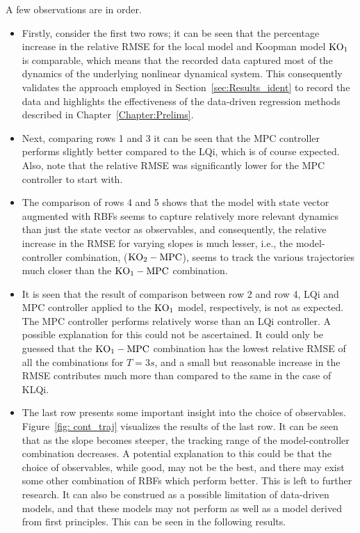 A few observations are in order. 
\begin{itemize}
    \item Firstly, consider the first two rows; it can be seen that the percentage increase in the relative RMSE for the local model and Koopman model $\textup{KO}_1$ is comparable, which means that the recorded data captured most of the dynamics of the underlying nonlinear dynamical system. This consequently validates the approach employed in Section~\ref{sec:Results_ident} to record the data and highlights the effectiveness of the data-driven regression methods described in Chapter~\ref{Chapter:Prelims}.
    \item Next, comparing rows 1 and 3 it can be seen that the MPC controller performs slightly better compared to the LQi, which is of course expected. Also, note that the relative RMSE was significantly lower for the MPC controller to start with.
    \item The comparison of rows 4 and 5 shows that the model with state vector augmented with RBFs seems to capture relatively more relevant dynamics than just the state vector as observables, and consequently, the relative increase in the RMSE for varying slopes is much lesser, i.e., the model-controller combination, ($\textup{KO}_2 - \textup{MPC}$), seems to track the various trajectories much closer than the $\textup{KO}_1 - \textup{MPC}$ combination.
    \item It is seen that the result of comparison between row 2 and row 4, LQi and MPC controller applied to the $\textup{KO}_1$ model, respectively, is not as expected. The MPC controller performs relatively worse than an LQi controller. A possible explanation for this could not be ascertained. It could only be guessed that the $\textup{KO}_1-\textup{MPC}$ combination has the lowest relative RMSE of all the combinations for $T = 3s$, and a small but reasonable increase in the RMSE contributes much more than compared to the same in the case of KLQi.
    \item The last row presents some important insight into the choice of observables.\\Figure~\ref{fig: cont_traj} visualizes the results of the last row. It can be seen that as the slope becomes steeper, the tracking range of the model-controller combination decreases. A potential explanation to this could be that the choice of observables, while good, may not be the best, and there may exist some other combination of RBFs which perform better. This is left to further research. It can also be construed as a possible limitation of data-driven models, and that these models may not perform as well as a model derived from first principles. This can be seen in the following results. 
\end{itemize}
